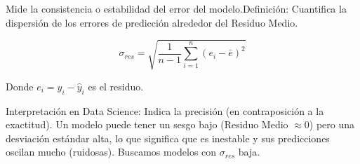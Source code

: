 		Mide la consistencia o estabilidad del error del modelo.Definición: Cuantifica la dispersión de los errores de predicción alrededor del Residuo Medio.
		
		\[
		\sigma_{res} = \sqrt{\frac{1}{n-1} \sum_{i=1}^{n} (e_i - \bar{e})^2}
		\]
		
		Donde $e_i = y_i - \hat{y}_i$ es el residuo.
		
		Interpretación en Data Science: Indica la precisión (en contraposición a la exactitud). Un modelo puede tener un sesgo bajo (Residuo Medio $\approx 0$) pero una desviación estándar alta, lo que significa que es inestable y sus predicciones oscilan mucho (ruidosas). Buscamos modelos con $\sigma_{res}$ baja.
		
		
	
		